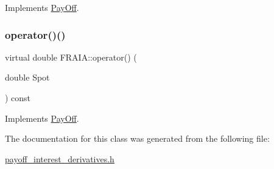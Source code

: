 Implements \hyperlink{classPayOff_ad8194d5b82247ae89c25c515f0ba806a}{Pay\+Off}.

\hypertarget{classFRAIA_a4b1c0992470500cfab0ce3bbecbc9176}{}\label{classFRAIA_a4b1c0992470500cfab0ce3bbecbc9176} 
\subsubsection{\texorpdfstring{operator()()}{operator()()}}
{\footnotesize\ttfamily virtual double F\+R\+A\+I\+A\+::operator() (\begin{DoxyParamCaption}\item[{double}]{Spot }\end{DoxyParamCaption}) const\hspace{0.3cm}{\ttfamily [virtual]}}



Implements \hyperlink{classPayOff_a5ae17d82c233ef5568c8fb0539703000}{Pay\+Off}.



The documentation for this class was generated from the following file\+:\begin{DoxyCompactItemize}
\item 
\hyperlink{payoff__interest__derivatives_8h}{payoff\+\_\+interest\+\_\+derivatives.\+h}\end{DoxyCompactItemize}
